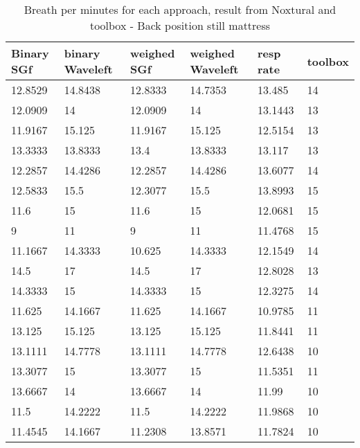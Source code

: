 \begin{table}
    \centering
    \begin{tabular}{|llllll|}
\hline 
Binary SGf & binary Waveleft & weighed  SGf & weighed Waveleft & resp rate & toolbox \\ 
\hline 
12.8529 & 14.8438 & 12.8333 & 14.7353 & 13.485 & 14 \\ 
12.0909 & 14 & 12.0909 & 14 & 13.1443 & 13 \\ 
11.9167 & 15.125 & 11.9167 & 15.125 & 12.5154 & 13 \\ 
13.3333 & 13.8333 & 13.4 & 13.8333 & 13.117 & 13 \\ 
12.2857 & 14.4286 & 12.2857 & 14.4286 & 13.6077 & 14 \\ 
12.5833 & 15.5 & 12.3077 & 15.5 & 13.8993 & 15 \\ 
11.6 & 15 & 11.6 & 15 & 12.0681 & 15 \\ 
9 & 11 & 9 & 11 & 11.4768 & 15 \\ 
11.1667 & 14.3333 & 10.625 & 14.3333 & 12.1549 & 14 \\ 
14.5 & 17 & 14.5 & 17 & 12.8028 & 13 \\ 
14.3333 & 15 & 14.3333 & 15 & 12.3275 & 14 \\ 
11.625 & 14.1667 & 11.625 & 14.1667 & 10.9785 & 11 \\ 
13.125 & 15.125 & 13.125 & 15.125 & 11.8441 & 11 \\ 
13.1111 & 14.7778 & 13.1111 & 14.7778 & 12.6438 & 10 \\ 
13.3077 & 15 & 13.3077 & 15 & 11.5351 & 11 \\ 
13.6667 & 14 & 13.6667 & 14 & 11.99 & 10 \\ 
11.5 & 14.2222 & 11.5 & 14.2222 & 11.9868 & 10 \\ 
11.4545 & 14.1667 & 11.2308 & 13.8571 & 11.7824 & 10 \\ 
\hline 
 \end{tabular}
\caption{Breath per minutes for each approach, result from Noxtural and toolbox
- Back position still mattress}
\end{table}

